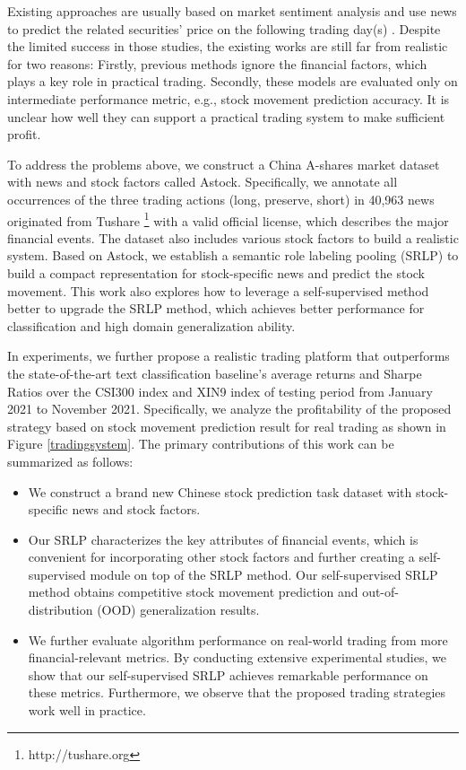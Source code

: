 \documentclass{article}
\begin{document}
Existing approaches are usually based on market sentiment analysis \cite{xu-cohen-2018-stock,cheng2021modeling} and use news to predict the related securities' price on the following trading day(s) \cite{zhang2017stock,li2020role}. Despite the limited success in those studies, the existing works are still far from realistic for two reasons: Firstly, previous methods ignore the financial factors, which plays a key role in practical trading. Secondly, these models are evaluated only on intermediate performance metric, e.g., stock movement prediction accuracy. It is unclear how well they can support a practical trading system to make sufficient profit. 


To address the problems above, we construct a China A-shares market dataset with news and stock factors called Astock. Specifically, we annotate all occurrences of the three trading actions (long, preserve, short) in 40,963 news originated from Tushare \footnote{http://tushare.org} with a valid official license, which describes the major financial events. The dataset also includes various stock factors to build a realistic system. Based on Astock, we establish a semantic role labeling pooling (SRLP) to build a compact representation for stock-specific news and predict the stock movement. This work also explores how to leverage a self-supervised method better to upgrade the SRLP method, which achieves better performance for classification and high domain generalization ability.

In experiments, we further propose a realistic trading platform that outperforms the state-of-the-art text classification baseline's average returns and Sharpe Ratios over the CSI300 index and XIN9 index of testing period from January 2021 to November 2021. Specifically, we analyze the profitability of the proposed strategy based on stock movement prediction result for real trading as shown in Figure \ref{tradingsystem}. The primary contributions of this work can be summarized as follows:
\begin{itemize}

\item We construct a brand new Chinese stock prediction task dataset with stock-specific news and stock factors.
\item Our SRLP characterizes the key attributes of financial events, which is convenient for incorporating other stock factors and further creating a self-supervised module on top of the SRLP method. Our self-supervised SRLP method obtains competitive stock movement prediction and out-of-distribution (OOD) generalization results.
\item We further evaluate algorithm performance on real-world trading from more financial-relevant metrics. By conducting extensive experimental studies, we show that our self-supervised SRLP achieves remarkable performance on these metrics. Furthermore, we observe that the proposed trading strategies work well in practice.
\end{itemize}
\end{document}
